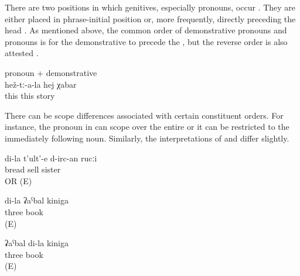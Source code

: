 \begin{exe}

\end{exe}


There are two positions in which genitives, especially  pronouns, occur . They are either placed in phrase-initial position  or, more frequently, directly preceding the head . As mentioned above, the common order of demonstrative pronouns and  pronouns is for the demonstrative to precede the  , but the reverse order is also attested .

\begin{exe}
		\ex	{} pronoun + demonstrative\\	\label{ex:their this story@11a}
		\gll	hež-tː-a-la	hej	χabar\\
			this	this	story\\
		\glt	{}
\end{exe}

There can be scope differences associated with certain constituent orders. For instance, the  pronoun in  can scope over the entire  or it can be restricted to the immediately following noun. Similarly, the interpretations of  and  differ slightly.

\begin{exe}
	\ex	\label{ex:‎‎‎my sister who sells bread}
	\gll	di-la	t'ult'-e	d-irc-an	rucːi\\
			bread	sell	sister\\
	\glt	{} OR  (E)

	\ex	\label{ex:ex:‎‎‎my three books ‎‎‎three books of mine}
	\begin{xlist}
		\ex	\label{ex:‎‎‎my three books ‎‎‎three books of mine@A}
		\gll	di-la	ʡaˁbal	kiniga\\
				three	book\\
		\glt	{} (E)
	
		\ex	\label{ex:‎‎‎my three books ‎‎‎three books of mine@B}
		\gll	ʡaˁbal	di-la	kiniga\\
			three		book\\
		\glt	{} (E)
	\end{xlist}
\end{exe}

